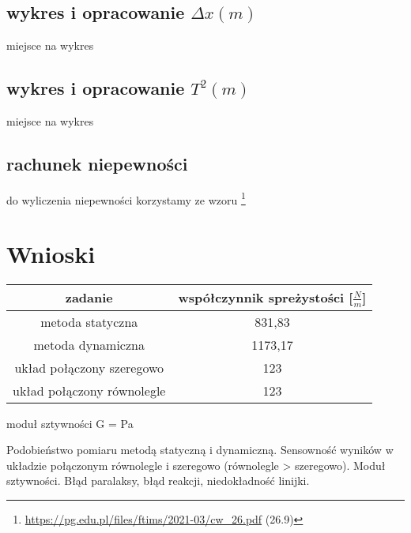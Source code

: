 \documentclass{article}
\begin{document}
\subsection{wykres i opracowanie $\Delta x(m)$}
miejsce na wykres

\subsection{wykres i opracowanie $T^2(m)$}
miejsce na wykres

\subsection{rachunek niepewności}
do wyliczenia niepewności korzystamy ze wzoru \footnote{\url{https://pg.edu.pl/files/ftims/2021-03/cw_26.pdf} (26.9)}


\section{Wnioski}

\begin{center}
\begin{tabular}{ c | c }
zadanie & współczynnik spreżystości [$\frac{N}{m}$]  \\


\hline
 metoda statyczna  & 831,83\\  
 metoda dynamiczna & 1173,17 \\
 układ połączony szeregowo & 123 \\
 układ połączony równolegle & 123 
\end{tabular}
\end{center}

\begin{center}
	moduł sztywności G = Pa
\end{center}

Podobieństwo pomiaru metodą statyczną i dynamiczną.
Sensowność wyników w układzie połączonym równolegle i szeregowo (równolegle > szeregowo).
Moduł sztywności.
Błąd paralaksy, błąd reakcji, niedokładność linijki.
\end{document}
